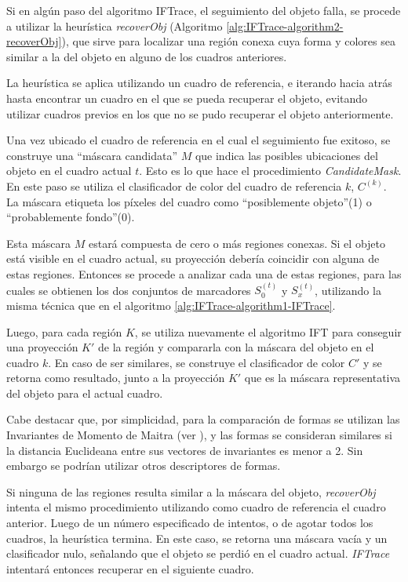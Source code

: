 \documentclass[a4paper,10pt]{article}
\begin{document}
Si en algún paso del algoritmo IFTrace, el seguimiento del objeto falla, se
procede a utilizar la heurística \textit{recoverObj} (Algoritmo
\ref{alg:IFTrace-algorithm2-recoverObj}), que sirve para localizar una región
conexa cuya forma y colores sea similar a la del objeto en alguno de los
cuadros anteriores.

La heurística se aplica utilizando un cuadro de referencia, e iterando hacia atrás
hasta encontrar un cuadro en el que se pueda recuperar el objeto, evitando
utilizar cuadros previos en los que no se pudo recuperar el objeto anteriormente.

Una vez ubicado el cuadro de referencia en el cual el seguimiento fue exitoso,
se construye una ``máscara candidata'' $M$ que indica las posibles ubicaciones
del objeto en el cuadro actual $t$. Esto es lo que hace el procedimiento \textit{CandidateMask}.
En este paso se
utiliza el clasificador de color del cuadro de referencia $k$, $C^{(k)}$. La máscara
etiqueta los píxeles del cuadro como ``posiblemente objeto''(1) o
``probablemente fondo''(0).

Esta máscara $M$ estará compuesta de cero
o más regiones conexas. Si el objeto está visible en el cuadro actual,
su proyección debería coincidir con alguna de estas regiones. Entonces
se procede a analizar cada una de estas regiones, para las cuales se obtienen
los dos conjuntos de marcadores $S_{0}^{(t)}$ y $S_{x}^{(t)}$, utilizando la misma técnica que en el
algoritmo \ref{alg:IFTrace-algorithm1-IFTrace}.

Luego, para cada región $K$, se utiliza nuevamente el algoritmo IFT para
conseguir una proyección $K'$ de la región y compararla con la máscara del
objeto en el cuadro $k$. En caso de ser similares, se construye el clasificador
de color $C'$ y se retorna como resultado, junto a la proyección $K'$ que es la
máscara representativa del objeto para el actual cuadro.

Cabe destacar que, por simplicidad, para la comparación de formas se utilizan
las Invariantes de Momento de Maitra (ver \cite{MaitraMomentInvariants}), y las
formas se consideran similares si la distancia Euclideana entre sus vectores de
invariantes es menor a 2. Sin embargo se podrían utilizar otros descriptores de
formas.

Si ninguna de las regiones resulta similar a la máscara del objeto,
\textit{recoverObj} intenta el mismo procedimiento utilizando como cuadro de
referencia el cuadro anterior. Luego de un número especificado de intentos, o
de agotar todos los cuadros, la heurística termina. En este caso, se retorna
una máscara vacía y un clasificador nulo, señalando que el objeto se perdió en
el cuadro actual. \textit{IFTrace} intentará entonces recuperar en el siguiente
cuadro.
\end{document}
